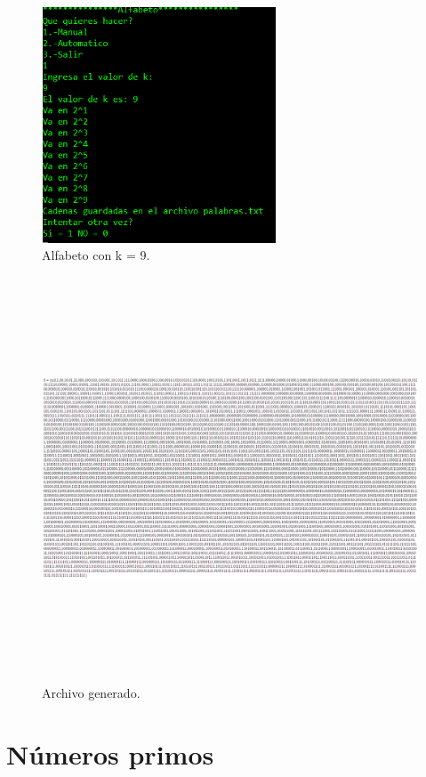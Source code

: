 \documentclass[12pt, titlepage]{article}
\begin{document}
	\begin{figure}[H]
		\begin{center}
			\includegraphics[width=7cm, height=7cm]{img/manual-alfabeto.png}
			\caption{Alfabeto con k = 9.}
			\label{fig:alfabeto3}
		\end{center}
	\end{figure}
	\begin{figure}[H]
		\begin{center}
			\includegraphics[width=\linewidth, height=12cm]{img/manual-alfabeto-salida.png}
			\caption{Archivo generado.}
			\label{fig:alfabeto4}
		\end{center}
	\end{figure}
	
	\section{Números primos}
\end{document}

